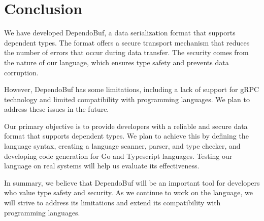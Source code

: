 \documentclass[conference]{IEEEtran}
\begin{document}
\section{Conclusion}

We have developed DependoBuf, a data serialization format that supports dependent types. The format offers a secure transport mechanism that reduces the number of errors that occur during data transfer. The security comes from the nature of our language, which ensures type safety and prevents data corruption.

However, DependoBuf has some limitations, including a lack of support for gRPC technology and limited compatibility with programming languages. We plan to address these issues in the future.

Our primary objective is to provide developers with a reliable and secure data format that supports dependent types. We plan to achieve this by defining the language syntax, creating a language scanner, parser, and type checker, and developing code generation for Go and Typescript languages. Testing our language on real systems will help us evaluate its effectiveness.

In summary, we believe that DependoBuf will be an important tool for developers who value type safety and security. As we continue to work on the language, we will strive to address its limitations and extend its compatibility with programming languages.




\vspace{12pt}

\end{document}
